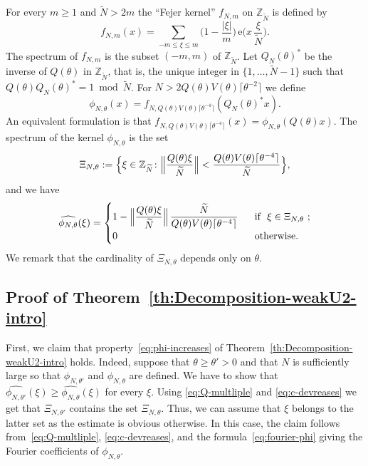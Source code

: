 \documentclass[11pt]{amsart}
\theoremstyle{definition}
\begin{document}
For every $m\geq 1$ and ${{\widetilde N}}>2m$ the ``Fejer kernel'' $f_{N,m}$ on
${{\mathbb Z}}_{{\widetilde N}}$ is defined by
$$
f_{N,m}(x)=\sum_{-m\leq\xi\leq
m}\bigl(1-\frac{|\xi|}m\bigr)\,{\mathrm{e}}\bigl(x\,\frac{\xi}{{\widetilde N}}\bigr).
$$
The spectrum  of $f_{N,m}$ is the subset $(-m,m)$ of ${{{\mathbb Z}}_{\widetilde N}}$. Let
$Q_N(\theta)^*$ be the inverse of $Q(\theta)$ in ${{\mathbb Z}}_{{\widetilde N}}$, that is,
the unique integer in $\{1,\dots,{{\widetilde N}}-1\}$ such that
$Q(\theta)Q_N(\theta)^*=1\bmod {{\widetilde N}}$.  For $N>
2Q(\theta)V(\theta)\lceil \theta^{-2}\rceil$ we define
\begin{equation}
\label{eq:def-phi} \phi_{N,\theta}(x)=f_{N,
Q(\theta)V(\theta)\lceil\theta^{-4}\rceil}(Q_N(\theta)^*x).
\end{equation}
An equivalent formulation is that $f_{N,
Q(\theta)V(\theta)\lceil\theta^{-4}\rceil}(x)=\phi_{N,\theta}(Q(\theta)x)$.
The
spectrum  of the kernel $\phi_{N,\theta}$ is the set
\begin{equation}
\label{eq:def-Xi} \Xi_{N,\theta}:=\Big\{\xi\in {{{\mathbb Z}}_{\widetilde N}}\colon
\Bigl\Vert\frac{Q(\theta) \xi}{{\widetilde N}}\Bigr\Vert<
\frac{Q(\theta)V(\theta)\lceil\theta^{-4}\rceil}{{\widetilde N}}\Big\},
\end{equation}
and we have
\begin{equation}
\label{eq:fourier-phi} \widehat{\phi_{N,\theta}}(\xi) =\begin{cases}
\displaystyle 1-\Bigl\Vert \frac{Q(\theta)\xi}{{\widetilde N}}\Bigr\Vert\, \frac
{{\widetilde N}}{ Q(\theta)V(\theta)\lceil\theta^{-4}\rceil}
&\ \  \text{if }\  \xi\in\Xi_{N,\theta} \  ;\\
0 & \ \ \text{otherwise.}
\end{cases}
\end{equation}
We remark that the cardinality of  $\Xi_{N,\theta}$ depends only on $\theta$.
\subsection{Proof of Theorem~\ref{th:Decomposition-weakU2-intro}}
First, we claim that  property~\eqref{eq:phi-increases} of
Theorem~\ref{th:Decomposition-weakU2-intro} holds. Indeed, suppose
that $\theta\geq\theta'>0$ and that $N$ is sufficiently large so
that $\phi_{N,\theta'}$ and $\phi_{N,\theta}$ are defined. We have
to show that $\widehat{\phi_{N,\theta'}}(\xi)\geq
\widehat{\phi_{N,\theta}}(\xi)$ for every $\xi$. Using
\eqref{eq:Q-multliple} and  \eqref{eq:c-devreases} we get that
$\Xi_{N,\theta'}$ contains the set $\Xi_{N,\theta}$. Thus,  we can
assume that $\xi$ belongs to the latter set as the estimate is
obvious otherwise. In this case, the claim follows
from~\eqref{eq:Q-multliple}, \eqref{eq:c-devreases}, and the
formula~\eqref{eq:fourier-phi} giving the Fourier coefficients of
$\phi_{N,\theta}$.
\end{document}
